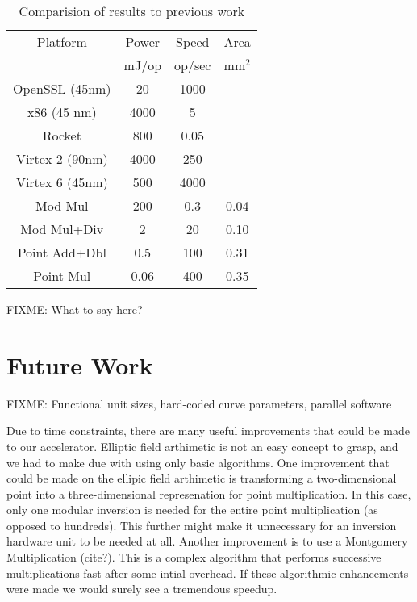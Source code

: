 \documentclass[twocolumn]{article}
\begin{document}
\begin{table}[ht]
  \begin{center}
    \begin{tabular}{c|ccc}
      Platform        & Power & Speed  & Area \\
                      & mJ/op & op/sec & mm$^2$ \\
      \hline
      OpenSSL (45nm)  & 20    & 1000   &      \\
      x86 (45 nm)     & 4000  & 5      &      \\
      Rocket          & 800   & 0.05   &      \\
      Virtex 2 (90nm) & 4000  & 250    &      \\
      Virtex 6 (45nm) & 500   & 4000   &      \\
      \hline
      Mod Mul         & 200   & 0.3    & 0.04 \\
      Mod Mul+Div     & 2     & 20     & 0.10 \\
      Point Add+Dbl   & 0.5   & 100    & 0.31 \\
      Point Mul       & 0.06  & 400    & 0.35 \\
    \end{tabular}
  \end{center}

  \caption{Comparision of results to previous work
    \label{results}}
\end{table}

FIXME: What to say here?

\section{Future Work}

FIXME: Functional unit sizes, hard-coded
curve parameters, parallel software

Due to time constraints, there are many useful improvements that could be made
to our accelerator. Elliptic field arthimetic is not an easy concept to grasp, and
we had to make due with using only basic algorithms. One improvement that could be made
on the ellipic field arthimetic is transforming a two-dimensional point into a three-dimensional
represenation for point multiplication. In this case, only one modular inversion is needed
for the entire point multiplication (as opposed to hundreds). This further might make it 
unnecessary for an inversion hardware unit to be needed at all. Another improvement is to use
a Montgomery Multiplication (cite?). This is a complex algorithm that performs successive 
multiplications fast after some intial overhead. If these algorithmic enhancements were made we
would surely see a tremendous speedup.
\end{document}
